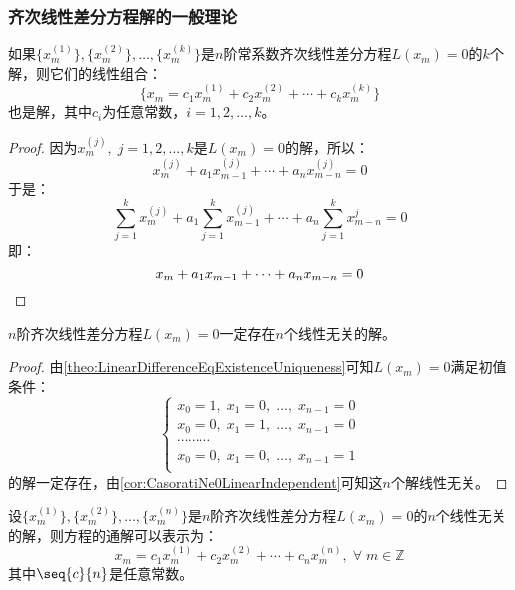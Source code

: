 \subsubsection{齐次线性差分方程解的一般理论}
\begin{theorem}\label{theo:LinearDifferenceLinearCombination}
	如果$\{x_m^{(1)}\},\{x_m^{(2)}\},\dots,\{x_m^{(k)}\}$是$n$阶常系数齐次线性差分方程$L(x_m)=0$的$k$个解，则它们的线性组合：
	\begin{equation*}
		\{x_m=c_1x_m^{(1)}+c_2x_m^{(2)}+\cdots+c_kx_m^{(k)}\}
	\end{equation*}
	也是解，其中$c_i$为任意常数，$i=1,2,\dots,k$。
\end{theorem}
\begin{proof}
	因为$x_m^{(j)},\;j=1,2,\dots,k$是$L(x_m)=0$的解，所以：
	\begin{equation*}
		x_m^{(j)}+a_{1}x_{m-1}^{(j)}+\cdots+a_nx_{m-n}^{(j)}=0
	\end{equation*}
	于是：
	\begin{equation*}
		\sum_{j=1}^{k}x_m^{(j)}+a_1\sum_{j=1}^{k}x_{m-1}^{(j)}+\cdots+a_n\sum_{j=1}^{k}x_{m-n}^{j}=0
	\end{equation*}
	即：
	\begin{equation*}
		x_m+a_{1}x_{m-1}+\cdots+a_nx_{m-n}=0\qedhere
	\end{equation*}
\end{proof}
\begin{theorem}
	$n$阶齐次线性差分方程$L(x_m)=0$一定存在$n$个线性无关的解。
\end{theorem}
\begin{proof}
	由\cref{theo:LinearDifferenceEqExistenceUniqueness}可知$L(x_m)=0$满足初值条件：
	\begin{equation*}
		\begin{cases}
			x_0=1,\;x_1=0,\;\dots,\;x_{n-1}=0 \\
			x_0=0,\;x_1=1,\;\dots,\;x_{n-1}=0 \\
			\cdots\cdots\cdots \\
			x_0=0,\;x_1=0,\;\dots,\;x_{n-1}=1 \\
		\end{cases}
	\end{equation*}
	的解一定存在，由\cref{cor:CasoratiNe0LinearIndependent}可知这$n$个解线性无关。
\end{proof}
\begin{theorem}\label{theo:GeneralSolutionHomogeneousLinearDifferenceEquation}
	设$\{x_m^{(1)}\},\{x_m^{(2)}\},\dots,\{x_m^{(n)}\}$是$n$阶齐次线性差分方程$L(x_m)=0$的$n$个线性无关的解，则方程的通解可以表示为：
	\begin{equation*}
		x_m=c_1x_m^{(1)}+c_2x_m^{(2)}+\cdots+c_nx_m^{(n)},\;\forall\;m\in\mathbb{Z}^{}
	\end{equation*}
	其中$\seq{c}{n}$是任意常数。
\end{theorem}

